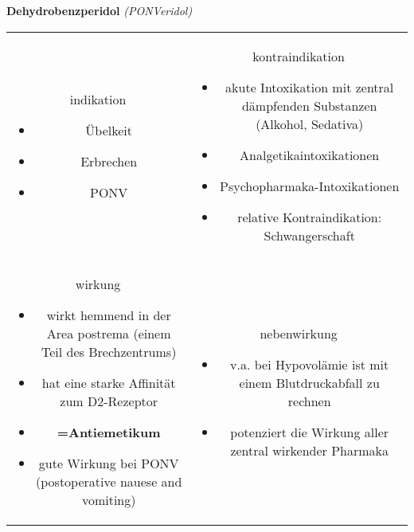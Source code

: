 \begin{frame}{
    \textbf{Dehydrobenzperidol}
    \textit{(PONVeridol)}
}
    \begin{tabular}{c c}
        \begin{beamercolorbox}[wd=\boxwidth\textwidth,ht=\boxheight\textheight,sep=1em]{indikation}
            \begin{itemize}
                \item Übelkeit
                \item Erbrechen
                \item PONV
            \end{itemize}
        \end{beamercolorbox} & 
        \begin{beamercolorbox}[wd=\boxwidth\textwidth,ht=\boxheight\textheight,sep=1em]{kontraindikation}
            \scriptsize
            \begin{itemize}
                \item akute Intoxikation mit zentral dämpfenden Substanzen (Alkohol, Sedativa) 
                \item Analgetikaintoxikationen
                \item Psychopharmaka-Intoxikationen
                \item relative Kontraindikation: Schwangerschaft
            \end{itemize}
        \end{beamercolorbox} \\
        \begin{beamercolorbox}[wd=\boxwidth\textwidth,ht=\boxheight\textheight,sep=1em]{wirkung}
            \scriptsize
            \begin{itemize}
                \item wirkt hemmend in der Area postrema (einem Teil des Brechzentrums)
                \item hat eine starke Affinität zum D2-Rezeptor
                \item \textbf{=Antiemetikum}
                \item gute Wirkung bei PONV (postoperative nauese and vomiting)
            \end{itemize}
        \end{beamercolorbox} & 
        \begin{beamercolorbox}[wd=\boxwidth\textwidth,ht=\boxheight\textheight,sep=1em]{nebenwirkung}
            \begin{itemize}
                \item v.a. bei Hypovolämie ist mit einem Blutdruckabfall zu rechnen
                \item potenziert die Wirkung aller zentral wirkender Pharmaka
            \end{itemize}
        \end{beamercolorbox} \\
    \end{tabular}
\end{frame}

